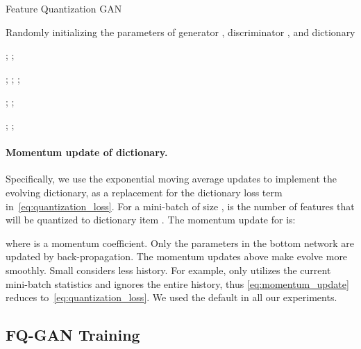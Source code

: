 \documentclass{article}
\begin{document}
\begin{algorithm}[!t]
   \caption{Feature Quantization GAN}
   \label{alg:example}
\begin{algorithmic}
    \REQUIRE Randomly initializing the parameters of generator , discriminator , and dictionary 
   
        \STATE {\quad {\small \color{blue} }}    
        ;
        ;
        
        \STATE{\quad {\small \color{blue} }}   
        ;
        ;
        ;
        
        \STATE{\quad {\small \color{blue} }} 
        ;
        ;
        
        \STATE{\quad {\small \color{blue} }} 
        ;
        ;
   \ENDFOR
\end{algorithmic}
\end{algorithm}


\paragraph{Momentum update of dictionary.}
Specifically, we use the exponential moving average updates to implement the evolving dictionary, as a replacement for the dictionary loss term in~\eqref{eq:quantization_loss}. For a mini-batch of size ,  is the number of features that will be quantized to dictionary item . The momentum update for  is:

where  is a momentum coefficient. Only the parameters in the bottom network  are updated by back-propagation. The momentum updates above make  evolve more smoothly. Small  considers less history. For example,  only utilizes the current mini-batch statistics and ignores the entire history, thus \eqref{eq:momentum_update} reduces to~\eqref{eq:quantization_loss}. We used the default  in all our experiments. 




\vspace{-2mm}
\subsection{FQ-GAN Training}
\end{document}
